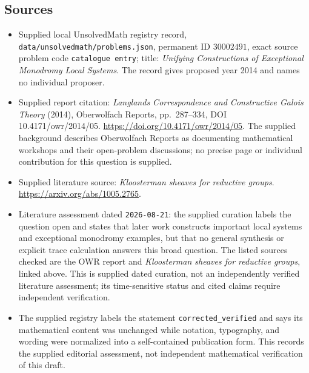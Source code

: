 \documentclass[11pt]{article}
\begin{document}
\subsection{Sources}
\begin{itemize}
\item Supplied local UnsolvedMath registry record, \texttt{data/unsolvedmath/problems.json}, permanent ID \(30002491\), exact source problem code \texttt{catalogue entry}; title: \emph{Unifying Constructions of Exceptional Monodromy Local Systems}. The record gives proposed year 2014 and names no individual proposer.
\item Supplied report citation: \emph{Langlands Correspondence and Constructive Galois Theory} (2014), Oberwolfach Reports, pp.\ 287--334, DOI 10.4171/owr/2014/05. \url{https://doi.org/10.4171/owr/2014/05}. The supplied background describes Oberwolfach Reports as documenting mathematical workshops and their open-problem discussions; no precise page or individual contribution for this question is supplied.
\item Supplied literature source: \emph{Kloosterman sheaves for reductive groups}. \url{https://arxiv.org/abs/1005.2765}.
\item Literature assessment dated \texttt{2026-08-21}: the supplied curation labels the question open and states that later work constructs important local systems and exceptional monodromy examples, but that no general synthesis or explicit trace calculation answers this broad question. The listed sources checked are the OWR report and \emph{Kloosterman sheaves for reductive groups}, linked above. This is supplied dated curation, not an independently verified literature assessment; its time-sensitive status and cited claims require independent verification.
\item The supplied registry labels the statement \texttt{corrected\_verified} and says its mathematical content was unchanged while notation, typography, and wording were normalized into a self-contained publication form. This records the supplied editorial assessment, not independent mathematical verification of this draft.
\end{itemize}
\end{document}
